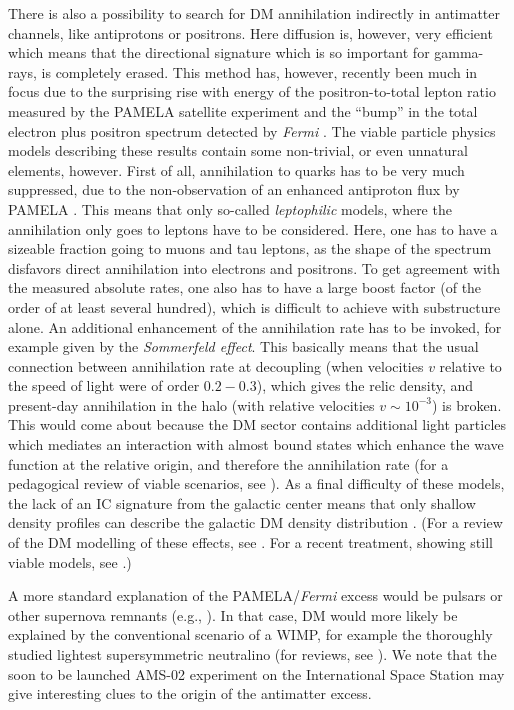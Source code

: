 \documentclass[10pt,aps,pra,reprint,amsmath,amsfonts,amssymb,showpacs,nofootinbib,floatfix]{revtex4-1}
\newcommand{\Fermi}{{\em Fermi}\xspace}
\begin{document}
There is also a possibility to search for DM annihilation indirectly
in antimatter channels, like antiprotons or positrons. Here diffusion
is, however, very efficient which means that the directional signature
which is so important for gamma-rays, is completely erased. This
method has, however, recently been much in focus due to the surprising
rise with energy of the positron-to-total lepton ratio measured by the
PAMELA satellite experiment \cite{Adriani:2008zr} and the ``bump'' in
the total electron plus positron spectrum detected by \Fermi
\cite{Abdo:2009zk}. The viable particle physics models describing
these results contain some non-trivial, or even unnatural elements,
however. First of all, annihilation to quarks has to be very much
suppressed, due to the non-observation of an enhanced antiproton flux
by PAMELA \cite{Adriani:2010rc}. This means that only so-called {\em
  leptophilic} models, where the annihilation only goes to leptons
have to be considered. Here, one has to have a sizeable fraction going
to muons and tau leptons, as the shape of the spectrum disfavors
direct annihilation into electrons and positrons. To get agreement
with the measured absolute rates, one also has to have a large boost
factor (of the order of at least several hundred), which is difficult
to achieve with substructure alone. An additional enhancement of the
annihilation rate has to be invoked, for example given by the {\em
  Sommerfeld effect}. This basically means that the usual connection
between annihilation rate at decoupling (when velocities $v$ relative
to the speed of light were of order $0.2 - 0.3$), which gives the
relic density, and present-day annihilation in the halo (with relative
velocities $v\sim 10^{-3}$) is broken. This would come about because
the DM sector contains additional light particles which mediates an
interaction with almost bound states which enhance the wave function
at the relative origin, and therefore the annihilation rate (for a
pedagogical review of viable scenarios, see
\cite{ArkaniHamed:2008qn}). As a final difficulty of these models, the
lack of an IC signature from the galactic center means that only
shallow density profiles can describe the galactic DM density
distribution
\cite{Bertone:2008xr,Cirelli:2008pk,Bergstrom:2008ag}. (For a review
of the DM modelling of these effects, see \cite{Bergstrom:2009ib}. For
a recent treatment, showing still viable models, see
\cite{Finkbeiner:2010sm}.)

A more standard explanation of the PAMELA/\Fermi excess would be
pulsars or other supernova remnants (e.g.,
\cite{1995PhRvD..52.3265A,Hooper:2008kg,Ahlers:2009ae}). In that case,
DM would more likely be explained by the conventional scenario of a WIMP,
for example the thoroughly studied lightest supersymmetric neutralino
(for reviews, see
\cite{Jungman:1995df,Bergstrom:2000pn,Bertone:2004pz}). We note that
the soon to be launched AMS-02 experiment on the International Space
Station \cite{ams02} may give interesting clues to the origin of the
antimatter excess.
\end{document}

